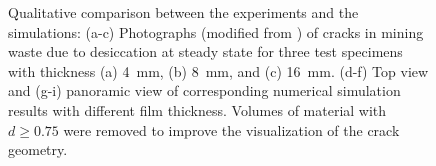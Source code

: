 \begin{figure}[!htb]
\begin{subfigure}{0.23\textwidth}
    \caption{}
  \end{subfigure}
  \caption[Qualitative comparison between the experiments and the simulations with different thickness.]{Qualitative comparison between the experiments and the simulations: (a-c) Photographs (modified from \cite{Rodriguez2006}) of  cracks in mining waste due to desiccation at steady state for three test specimens with thickness (a) \SI{4}{\milli\meter}, (b) \SI{8}{\milli\meter}, and (c) \SI{16}{\milli\meter}.  (d-f) Top view and (g-i) panoramic view of corresponding numerical simulation results with different film thickness.  Volumes of material with $d \geqslant 0.75$ were removed to improve the visualization of the crack geometry. }
  \label{fig: Chapter4/3D/3D}
\end{figure}
